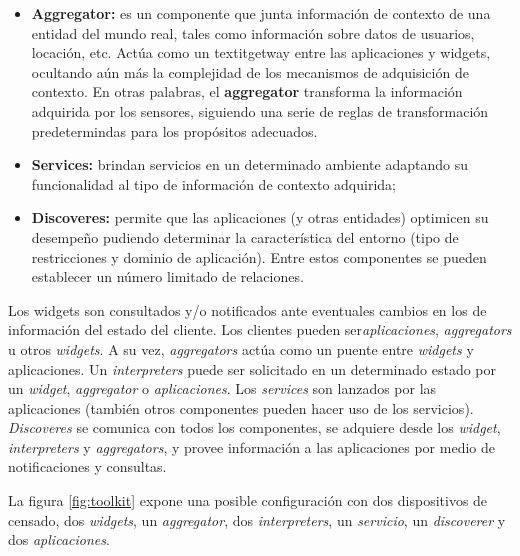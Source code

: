 \begin{itemize}
\begin{itemize}
\item \textbf{Aggregator:} es un componente que junta información de contexto de una entidad del mundo real, tales como información sobre datos de usuarios, locación, etc. Actúa como un textit{getway} entre las aplicaciones y  widgets, ocultando aún más la complejidad de los mecanismos de adquisición de contexto. En otras palabras, el \textbf{aggregator} transforma la información adquirida por los sensores, siguiendo una serie de reglas de transformación predetermindas para los propósitos adecuados.


\item \textbf{Services:} brindan servicios en un determinado ambiente
adaptando su funcionalidad al tipo de información de contexto adquirida; 

\item \textbf{Discoveres:} permite que las aplicaciones (y otras entidades)
optimicen su desempeño pudiendo determinar la característica del entorno
(tipo de restricciones y dominio de aplicación). Entre estos componentes
se pueden establecer un número limitado de relaciones.

\end{itemize}

Los widgets son consultados y/o notificados ante eventuales cambios en los de información del estado del cliente. Los clientes pueden ser\textit{aplicaciones}, \textit{aggregators} u otros \textit{widgets}. A su vez, \textit{aggregators} actúa como un puente entre \textit{widgets} y aplicaciones. Un \textit{interpreters} puede ser solicitado en un determinado estado por un \textit{widget}, \textit{aggregator} o \textit{aplicaciones}. Los \textit{services} son lanzados por las aplicaciones (también otros componentes pueden hacer uso de los servicios). \textit{Discoveres} se comunica con todos los componentes, se adquiere desde los \textit{widget}, \textit{interpreters} y \textit{aggregators}, y provee información a las aplicaciones por medio de notificaciones y consultas.

La figura \ref{fig:toolkit} expone una posible configuración con dos dispositivos de censado, dos \textit{widgets}, un \textit{aggregator}, dos \textit{interpreters}, un \textit{servicio}, un \textit{discoverer} y dos \textit{aplicaciones}.



\end{itemize}
